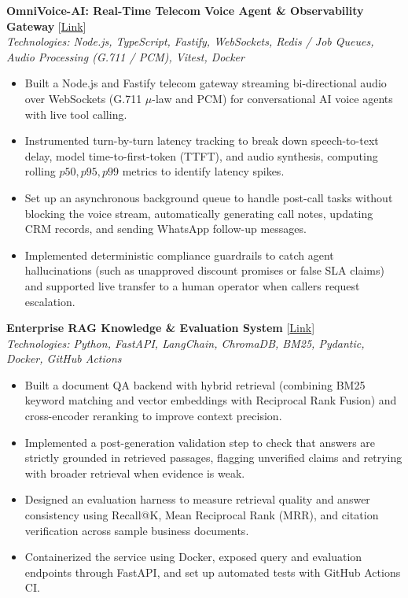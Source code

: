\documentclass[a4paper,10pt]{article}
\begin{document}
\noindent\textbf{OmniVoice-AI: Real-Time Telecom Voice Agent \& Observability Gateway} \hfill [\href{https://github.com/roshani-005/OmniVoice-AI}{Link}] \\
\textit{Technologies: Node.js, TypeScript, Fastify, WebSockets, Redis / Job Queues, Audio Processing (G.711 / PCM), Vitest, Docker}
\begin{itemize}
    \item Built a Node.js and Fastify telecom gateway streaming bi-directional audio over WebSockets (G.711 $\mu$-law and PCM) for conversational AI voice agents with live tool calling.
    \item Instrumented turn-by-turn latency tracking to break down speech-to-text delay, model time-to-first-token (TTFT), and audio synthesis, computing rolling $p50, p95, p99$ metrics to identify latency spikes.
    \item Set up an asynchronous background queue to handle post-call tasks without blocking the voice stream, automatically generating call notes, updating CRM records, and sending WhatsApp follow-up messages.
    \item Implemented deterministic compliance guardrails to catch agent hallucinations (such as unapproved discount promises or false SLA claims) and supported live transfer to a human operator when callers request escalation.
\end{itemize}

\vspace{1.5pt}

\noindent\textbf{Enterprise RAG Knowledge \& Evaluation System} \hfill [\href{https://github.com/roshani-005/Enterprise-RAG-Knowledge-Evaluation-System}{Link}] \\
\textit{Technologies: Python, FastAPI, LangChain, ChromaDB, BM25, Pydantic, Docker, GitHub Actions}
\begin{itemize}
    \item Built a document QA backend with hybrid retrieval (combining BM25 keyword matching and vector embeddings with Reciprocal Rank Fusion) and cross-encoder reranking to improve context precision.
    \item Implemented a post-generation validation step to check that answers are strictly grounded in retrieved passages, flagging unverified claims and retrying with broader retrieval when evidence is weak.
    \item Designed an evaluation harness to measure retrieval quality and answer consistency using Recall@K, Mean Reciprocal Rank (MRR), and citation verification across sample business documents.
    \item Containerized the service using Docker, exposed query and evaluation endpoints through FastAPI, and set up automated tests with GitHub Actions CI.
\end{itemize}
\end{document}

